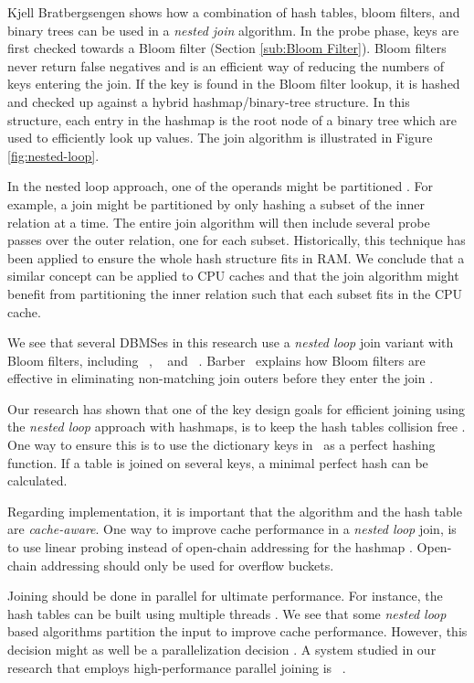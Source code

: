 Kjell Bratbergsengen shows how a combination of hash tables, bloom filters, and binary trees can be used in a \textit{nested join} algorithm. In the probe phase, keys are first checked towards a Bloom filter (Section \ref{sub:Bloom Filter}). Bloom filters never return false negatives and is an efficient way of reducing the numbers of keys entering the join. If the key is found in the Bloom filter lookup, it is hashed and checked up against a hybrid hashmap/binary-tree structure. In this structure, each entry in the hashmap is the root node of a binary tree which are used to efficiently look up values. The join algorithm is illustrated in Figure \ref{fig:nested-loop}.

In the nested loop approach, one of the operands might be partitioned \cite{Bratbergsengen2015-ed}. For example, a join might be partitioned by only hashing a subset of the inner relation at a time. The entire join algorithm will then include several probe passes over the outer relation, one for each subset. Historically, this technique has been applied to ensure the whole hash structure fits in RAM. We conclude that a similar concept can be applied to CPU caches and that the join algorithm might benefit from partitioning the inner relation such that each subset fits in the CPU cache.

We see that several DBMSes in this research use a \textit{nested loop} join variant with Bloom filters, including \oracle~\cite{Lahiri2015-mz}, \ibm~\cite{Raman2013-em} and \blink~\cite{Raman2008-gi}. Barber \ea~explains how Bloom filters are effective in eliminating non-matching join outers before they enter the join \cite{Barber2014-ey}.

Our research has shown that one of the key design goals for efficient joining using the \textit{nested loop} approach with hashmaps, is to keep the hash tables collision free \cite{Raman2008-gi, Raman2013-em}. One way to ensure this is to use the dictionary keys in \de~as a perfect hashing function. If a table is joined on several keys, a minimal perfect hash can be calculated.

Regarding implementation, it is important that the algorithm and the hash table are \textit{cache-aware}. One way to improve cache performance in a \textit{nested loop} join, is to use linear probing instead of open-chain addressing for the hashmap \cite{Raman2008-gi}. Open-chain addressing should only be used for overflow buckets.

Joining should be done in parallel for ultimate performance. For instance, the hash tables can be built using multiple threads \cite{Barber2014-ey}. We see that some \textit{nested loop} based algorithms partition the input to improve cache performance. However, this decision might as well be a parallelization decision \cite{Neumann2011-uq}. A system studied in our research that employs high-performance parallel joining is \ibm~\cite{Raman2013-em}.

